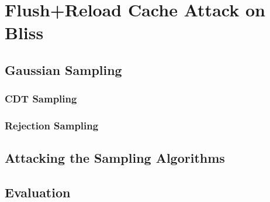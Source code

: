 %
%

\chapter{Flush+Reload Cache Attack on Bliss}

\section{Gaussian Sampling} %

\subsection{CDT Sampling}

\subsection{Rejection Sampling}

\section{Attacking the Sampling Algorithms}

\section{Evaluation}